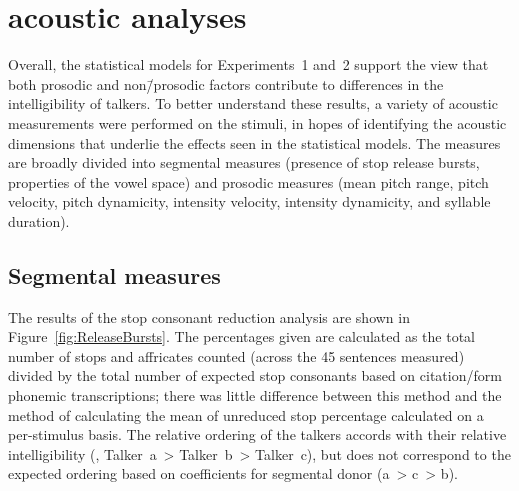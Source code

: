 \section{\Ph{} acoustic analyses}
Overall, the statistical models for Experiments~1 and~2 support the view that both prosodic and non\=/prosodic factors contribute to differences in the intelligibility of talkers.  To better understand these results, a variety of acoustic measurements were performed on the stimuli, in hopes of identifying the acoustic dimensions that underlie the effects seen in the statistical models.  The measures are broadly divided into segmental measures (presence of stop release bursts, properties of the vowel space) and prosodic measures (mean pitch range, pitch velocity, pitch dynamicity, intensity velocity, intensity dynamicity, and syllable duration).

\subsection{Segmental measures}
The results of the stop consonant reduction analysis are shown in Figure~\ref{fig:ReleaseBursts}.  The percentages given are calculated as the total number of stops and affricates counted (across the 45 sentences measured) divided by the total number of expected stop consonants based on citation\-/form phonemic transcriptions; there was little difference between this method and the method of calculating the mean of unreduced stop percentage calculated on a per-stimulus basis.  The relative ordering of the talkers accords with their relative intelligibility (\ie, Talker~\ac{a}~> Talker~\ac{b}~> Talker~\ac{c}), but does not correspond to the expected ordering based on coefficients for segmental donor (\ac{a}~> \ac{c}~> \ac{b}).  

